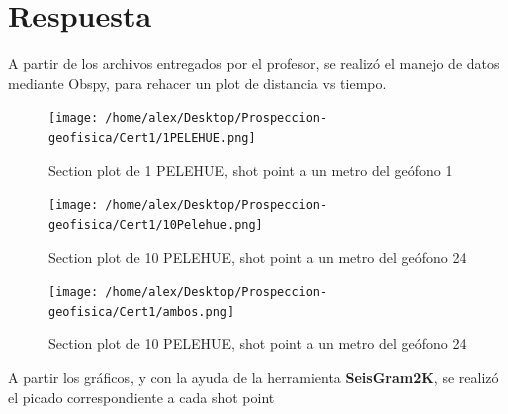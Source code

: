 \documentclass{article}
\theoremstyle{mytheoremstyle}
\theoremstyle{mytheoremstyle}
\theoremstyle{myproblemstyle}
\begin{document}
	\section*{Respuesta}
	A partir de los archivos entregados por el profesor, se realizó el manejo de datos mediante Obspy, para rehacer un plot de distancia vs tiempo.
	\begin{figure}[h]
		\texttt{[image: /home/alex/Desktop/Prospeccion-geofisica/Cert1/1PELEHUE.png]}
		\caption{Section plot de 1 PELEHUE, shot point a un metro del geófono 1}
	\end{figure}
	\begin{figure}[h]
		\texttt{[image: /home/alex/Desktop/Prospeccion-geofisica/Cert1/10Pelehue.png]}
		\caption{Section plot de 10 PELEHUE, shot point a un metro del geófono 24}
	\end{figure}
	\begin{figure}[h]
		\texttt{[image: /home/alex/Desktop/Prospeccion-geofisica/Cert1/ambos.png]}
		\caption{Section plot de 10 PELEHUE, shot point a un metro del geófono 24}
	\end{figure}
	\newpage
	A partir los gráficos, y con la ayuda de la herramienta \textbf{SeisGram2K}, se realizó el picado correspondiente a cada shot point
\end{document}
